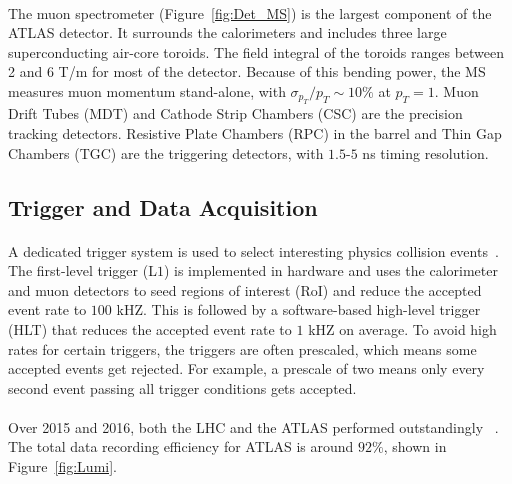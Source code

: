 \paragraph{}
The muon spectrometer (Figure~\ref{fig:Det_MS}) is the largest component of the ATLAS detector.
It surrounds the calorimeters and includes three large superconducting air-core toroids. 
The field integral of the toroids ranges between 2 and 6 T/m for most of the detector. Because of this bending power, the MS measures muon momentum stand-alone, with $\sigma_{p_{T}}/p_{T} \sim 10\%$ at $p_{T} = 1$\TeV. 
Muon Drift Tubes (MDT) and Cathode Strip Chambers (CSC) are the precision tracking detectors. 
Resistive Plate Chambers (RPC) in the barrel and Thin Gap Chambers (TGC) are the triggering detectors, with $1.5$-$5$ ns timing resolution. 

\subsection{Trigger and Data Acquisition}
\paragraph{}
A dedicated trigger system is used to select interesting physics collision events~\cite{ATLAS-TRIGGER}.
The first-level trigger (L$1$) is implemented in hardware and uses the calorimeter and muon detectors to seed regions of interest (RoI) and reduce the accepted event rate to $100$ kHZ.
This is followed by a software-based high-level trigger (HLT) that reduces the accepted event rate to $1$ kHZ on average. 
To avoid high rates for certain triggers, the triggers are often prescaled, which means some accepted events get rejected. 
For example, a prescale of two means only every second event passing all trigger conditions gets accepted. 

\paragraph{}
Over 2015 and 2016, both the LHC and the ATLAS performed outstandingly ~\cite{Lumi_Run2}. The total data recording efficiency for ATLAS is around $92\%$, shown in Figure~\ref{fig:Lumi}.

